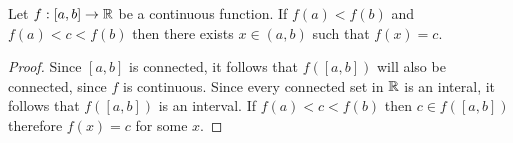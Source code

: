 \begin{theorem}\label{thm:IVT}
  Let $f:[a,b] \to \mathbb{R}$ be a continuous function. If $f(a)<f(b)$ and $f(a)<c<f(b)$ then there exists $x\in (a,b)$ such that $f(x) = c$.
\end{theorem}
\begin{proof}
  Since $[a,b]$ is connected, it follows that $f([a,b])$ will also be connected, since $f$ is continuous. Since every connected set in $\mathbb{R}$ is an interal, it follows that $f([a,b])$ is an interval. If $f(a)<c<f(b)$ then $c\in f([a,b])$ therefore $f(x) =c$ for some $x$.
\end{proof}
